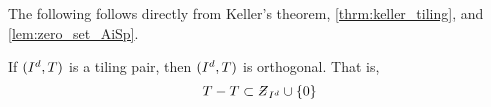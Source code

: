 \documentclass[../thesis.tex]{subfiles}
\begin{document}
The following  follows directly from Keller's theorem, \cref{thrm:keller_tiling}, and \cref{lem:zero_set_AiSp}.
\begin{corollary}\label{cor:tiling_pair_implies_orthogonal}
    If $(I^d,T)$ is a tiling pair, then $(I^d,T)$ is orthogonal. That is,
    \begin{equation*}
        T-T \subset \Zstroke_{I^d}\cup \braq{0}
    \end{equation*}
\end{corollary}


\end{document}

